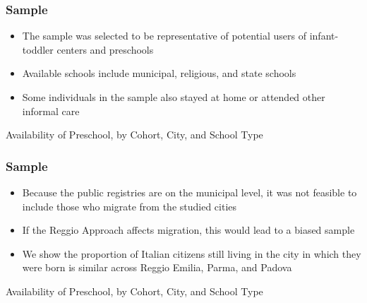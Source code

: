 \documentclass[static]{JJH-Beamer_PAGENOS}
\begin{document}
\begin{frame}
\frametitle{Sample}
\begin{itemize}
	\item The sample was selected to be representative of potential users of infant-toddler centers and preschools
	\item Available schools include municipal, religious, and state schools
	\item Some individuals in the sample also stayed at home or attended other informal care
\end{itemize}
\begin{table}[H]
\caption{Availability of Preschool, by Cohort, City, and School Type}
\end{table}
\end{frame}


\begin{frame}
\frametitle{Sample}
\begin{itemize}
	\item Because the public registries are on the municipal level, it was not feasible to include those who migrate from the studied cities
	\item If the Reggio Approach affects migration, this would lead to a biased sample
	\item We show the proportion of Italian citizens still living in the city in which they were born is similar across Reggio Emilia, Parma, and Padova
\end{itemize}
\begin{table}[H]
\caption{Availability of Preschool, by Cohort, City, and School Type}
\end{table}
\end{frame}

\end{document}

